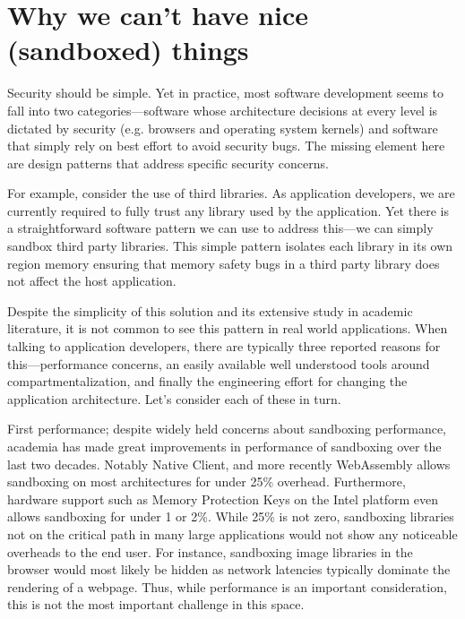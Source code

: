 \section{Why we can't have nice (sandboxed) things}


Security should be simple. Yet in practice, most software development seems to 
fall into two categories---software whose architecture decisions at every level 
is dictated by security (e.g. browsers and operating system kernels) and 
software that simply rely on best effort to avoid security bugs.
%
The missing element here are design patterns that address specific security 
concerns. 

For example, consider the use of third libraries.
%
As application developers, we are currently required to fully trust any library 
used by the application.
%
Yet there is a straightforward software pattern we can use to address this---we 
can simply sandbox third party libraries.
%
This simple pattern isolates each library in its own region memory ensuring 
that memory safety bugs in a third party library does not affect the host 
application.

Despite the simplicity of this solution and its extensive study in academic 
literature, it is not common to see this pattern in real world applications.
%
When talking to application developers, there are typically three reported 
reasons for this---performance concerns, an easily available well understood 
tools around compartmentalization, and finally the engineering effort for 
changing the application architecture.
%
Let's consider each of these in turn.

First performance; despite widely held concerns about sandboxing performance, 
academia has made great improvements in performance of sandboxing over 
the last two decades.
%
Notably Native Client, and more recently WebAssembly allows sandboxing on most 
architectures for under 25\% overhead.
%
Furthermore, hardware support such as Memory Protection Keys on the Intel 
platform even allows sandboxing for under 1 or 2\%.
%
While 25\% is not zero, sandboxing libraries not on the critical path in many 
large applications would not show any noticeable overheads to the end user.
%
For instance, sandboxing image libraries in the browser would most likely be 
hidden as network latencies typically dominate the rendering of a webpage.
%
Thus, while performance is an important consideration, this is not the most 
important challenge in this space.

